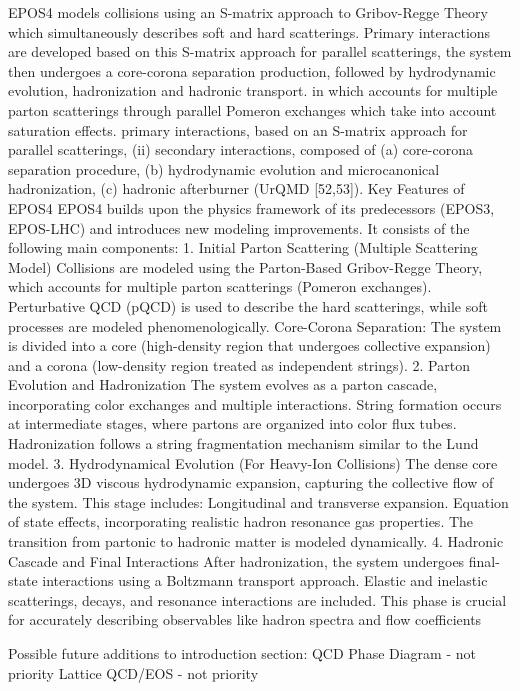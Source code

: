 EPOS4 models collisions using an S-matrix approach to Gribov-Regge Theory which simultaneously describes soft and hard scatterings. 
Primary interactions are developed based on this S-matrix approach for parallel scatterings, the system then undergoes a core-corona separation production, followed by hydrodynamic evolution, hadronization and hadronic transport. 
in  which accounts for multiple parton scatterings through parallel Pomeron exchanges which take into account saturation effects. 
primary interactions, based on an S-matrix approach for parallel scatterings, (ii) secondary interactions, composed of (a) core-corona separation procedure, (b) hydrodynamic evolution and microcanonical hadronization, (c) hadronic afterburner (UrQMD [52,53]).
Key Features of EPOS4
EPOS4 builds upon the physics framework of its predecessors (EPOS3, EPOS-LHC) and introduces new modeling improvements. It consists of the following main components:
1. Initial Parton Scattering (Multiple Scattering Model)
Collisions are modeled using the Parton-Based Gribov-Regge Theory, which accounts for multiple parton scatterings (Pomeron exchanges).
Perturbative QCD (pQCD) is used to describe the hard scatterings, while soft processes are modeled phenomenologically.
Core-Corona Separation:
The system is divided into a core (high-density region that undergoes collective expansion) and a corona (low-density region treated as independent strings).
2. Parton Evolution and Hadronization
The system evolves as a parton cascade, incorporating color exchanges and multiple interactions.
String formation occurs at intermediate stages, where partons are organized into color flux tubes.
Hadronization follows a string fragmentation mechanism similar to the Lund model.
3. Hydrodynamical Evolution (For Heavy-Ion Collisions)
The dense core undergoes 3D viscous hydrodynamic expansion, capturing the collective flow of the system.
This stage includes:
Longitudinal and transverse expansion.
Equation of state effects, incorporating realistic hadron resonance gas properties.
The transition from partonic to hadronic matter is modeled dynamically.
4. Hadronic Cascade and Final Interactions
After hadronization, the system undergoes final-state interactions using a Boltzmann transport approach.
Elastic and inelastic scatterings, decays, and resonance interactions are included.
This phase is crucial for accurately describing observables like hadron spectra and flow coefficients

Possible future additions to introduction section:
QCD Phase Diagram - not priority
Lattice QCD/EOS - not priority

